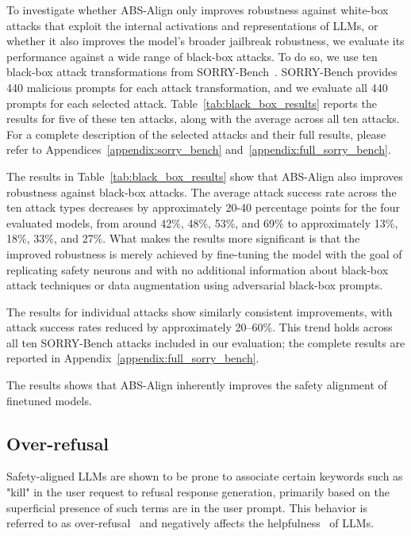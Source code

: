 To investigate whether ABS-Align only improves robustness against white-box attacks that exploit the internal activations and representations of LLMs, or whether it also improves the model's broader jailbreak robustness, we evaluate its performance against a wide range of black-box attacks. To do so, we use ten black-box attack transformations from SORRY-Bench~\cite{xie2025sorrybench}. SORRY-Bench provides 440 malicious prompts for each attack transformation, and we evaluate all 440 prompts for each selected attack. Table~\ref{tab:black_box_results} reports the results for five of these ten attacks, along with the average across all ten attacks. For a complete description of the selected attacks and their full results, please refer to Appendices~\ref{appendix:sorry_bench} and~\ref{appendix:full_sorry_bench}.

The results in Table~\ref{tab:black_box_results} show that ABS-Align also improves robustness against black-box attacks. The average attack success rate across the ten attack types decreases by approximately 20-40 percentage points for the four evaluated models, from around 42\%, 48\%, 53\%, and 69\% to approximately 13\%, 18\%, 33\%, and 27\%. What makes the results more significant is that the improved robustness is merely achieved by fine-tuning the model with the goal of replicating safety neurons and with no additional information about black-box attack techniques or data augmentation using adversarial black-box prompts.

The results for individual attacks show similarly consistent improvements, with attack success rates reduced by approximately 20--60\%. This trend holds across all ten SORRY-Bench attacks included in our evaluation; the complete results are reported in Appendix~\ref{appendix:full_sorry_bench}.

The results shows that ABS-Align inherently improves the safety alignment of finetuned models.






\subsection{Over-refusal}
\label{subsec:over_refusal}

Safety-aligned LLMs are shown to be prone to associate certain keywords such as "kill" in the user request to refusal response generation, primarily based on the superficial presence of such terms are in the user prompt. This behavior is referred to as over-refusal~\cite{rottger2024xstest, cui2025orbench} and negatively affects the helpfulness~\cite{ouyang2022rlhf} of LLMs.

